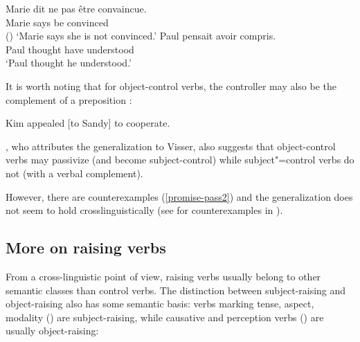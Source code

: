 \documentclass[output=paper
	        ,collection
	        ,collectionchapter
 	        ,biblatex
                ,babelshorthands
                ,newtxmath
                ,draftmode
                ,colorlinks, citecolor=brown
]{langscibook}
\begin{document}
\begin{exe}
\ex \begin{xlist}
\ex 
\gll Marie dit {ne pas} \^etre convaincue.\\
     Marie says  be convinced \\\hfill()
\glt `Marie says she is not convinced.'	
\ex 
\gll Paul pensait  avoir compris. \\
     Paul thought have understood \\
\glt `Paul thought he understood.'
 \end{xlist}
\end{exe}

It is worth noting that for object-control verbs, the controller may also be the complement of a preposition \citep[]{PollardandSag1994}:

\begin{exe}
\ex Kim appealed [to Sandy] to cooperate. \label{to}
\end{exe}


 
\citet[]{Bresnan1982}, who attributes the generalization to Visser, also suggests that object-control verbs may passivize (and become subject-control) while subject"=control verbs do not (with a verbal complement).

\eal
{}\label{persuade-pass}
\label{promise-pass}
\label{promise-pass2}
\zl
However, there are counterexamples (\ref{promise-pass2}) and the generalization does not seem to hold crosslinguistically (see  for counterexamples in ).
 
\subsection{More on raising verbs}
\label{sec-more-on-raising-verbs}

From a cross-linguistic point of view, raising verbs usually belong to other semantic classes than control verbs. The distinction between subject-raising and object-raising also has some semantic basis: verbs marking tense, aspect, modality () are subject-raising, while
causative and perception verbs () are usually object-raising:
\end{document}
